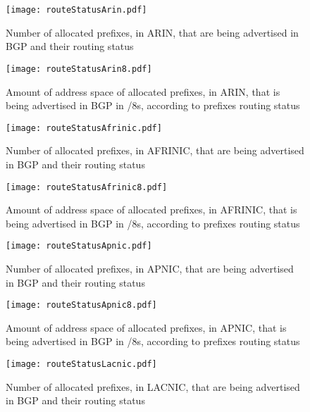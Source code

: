 \documentclass[11pt,a4paper]{scrreprt}
\begin{document}
\begin{appendices}
\begin{figure}[!h]
\centering
\texttt{[image: routeStatusArin.pdf]}
\caption{Number of allocated prefixes, in ARIN, that are being advertised in BGP and their routing status}
\label{fig:routingStatusArin}
\end{figure}

\begin{figure}[!h]
\centering
\texttt{[image: routeStatusArin8.pdf]}
\caption{Amount of address space of allocated prefixes, in ARIN, that is being advertised in BGP in /8s, according to prefixes routing status}
\label{fig:routingStatusArin8}
\end{figure}

\begin{figure}[!h]
\centering
\texttt{[image: routeStatusAfrinic.pdf]}
\caption{Number of allocated prefixes, in AFRINIC, that are being advertised in BGP and their routing status}
\label{fig:routingStatusAfrinic}
\end{figure}

\begin{figure}[!h]
\centering
\texttt{[image: routeStatusAfrinic8.pdf]}
\caption{Amount of address space of allocated prefixes, in AFRINIC, that is being advertised in BGP in /8s, according to prefixes routing status}
\label{fig:routingStatusAfrinic8}
\end{figure}

\begin{figure}[!h]
\centering
\texttt{[image: routeStatusApnic.pdf]}
\caption{Number of allocated prefixes, in APNIC, that are being advertised in BGP and their routing status}
\label{fig:routingStatusApnic}
\end{figure}

\begin{figure}[!h]
\centering
\texttt{[image: routeStatusApnic8.pdf]}
\caption{Amount of address space of allocated prefixes, in APNIC, that is being advertised in BGP in /8s, according to prefixes routing status}
\label{fig:routingStatusApnic8}
\end{figure}

\begin{figure}[!h]
\centering
\texttt{[image: routeStatusLacnic.pdf]}
\caption{Number of allocated prefixes, in LACNIC, that are being advertised in BGP and their routing status}
\label{fig:routingStatusLacnic}
\end{figure}


\end{appendices}
\end{document}
